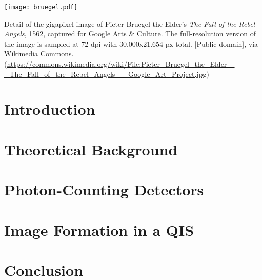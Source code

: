 \documentclass[sigplan,screen]{acmart}
\begin{document}
\begin{teaserfigure}
  \texttt{[image: bruegel.pdf]}
  \caption{Detail of the gigapixel image of Pieter Bruegel the Elder's \textit{The Fall of the Rebel Angels}, 1562, captured for Google Arts \& Culture. The full-resolution version of the image is sampled at 72 dpi with 30.000x21.654 px total. [Public domain], via Wikimedia Commons.
  (\url{https://commons.wikimedia.org/wiki/File:Pieter_Bruegel_the_Elder_-_The_Fall_of_the_Rebel_Angels_-_Google_Art_Project.jpg})}
  \label{fig:teaser}
\end{teaserfigure}

\maketitle

\section{Introduction}


\section{Theoretical Background}


\section{Photon-Counting Detectors}


\section{Image Formation in a QIS}


\section{Conclusion}


\end{document}
